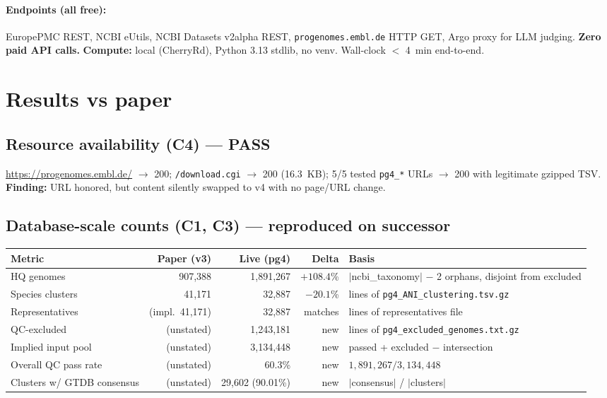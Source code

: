 \documentclass[11pt]{article}
\begin{document}
\paragraph{Endpoints (all free):} EuropePMC REST, NCBI eUtils, NCBI Datasets v2alpha REST, \texttt{progenomes.embl.de} HTTP GET, Argo proxy for LLM judging. \textbf{Zero paid API calls.} \textbf{Compute:} local (CherryRd), Python 3.13 stdlib, no venv. Wall-clock $<$ 4~min end-to-end.

\section{Results vs paper}

\subsection{Resource availability (C4) --- \textcolor{green!50!black}{PASS}}
\url{https://progenomes.embl.de/} $\to$ 200; \texttt{/download.cgi} $\to$ 200 (16.3~KB); 5/5 tested \texttt{pg4\_*} URLs $\to$ 200 with legitimate gzipped TSV. \textbf{Finding:} URL honored, but content silently swapped to v4 with no page/URL change.

\subsection{Database-scale counts (C1, C3) --- \textcolor{green!50!black}{reproduced on successor}}

\begin{center}
\begin{tabular}{lrrrl}
\toprule
Metric & Paper (v3) & Live (pg4) & Delta & Basis \\
\midrule
HQ genomes & 907{,}388 & 1{,}891{,}267 & $+108.4$\% & $|$ncbi\_taxonomy$|$ $-$ 2 orphans, disjoint from excluded \\
Species clusters & 41{,}171 & 32{,}887 & $-20.1$\% & lines of \texttt{pg4\_ANI\_clustering.tsv.gz} \\
Representatives & (impl.\ 41{,}171) & 32{,}887 & matches & lines of representatives file \\
QC-excluded & (unstated) & 1{,}243{,}181 & new & lines of \texttt{pg4\_excluded\_genomes.txt.gz} \\
Implied input pool & (unstated) & 3{,}134{,}448 & new & passed + excluded $-$ intersection \\
Overall QC pass rate & (unstated) & 60.3\% & new & $1{,}891{,}267 / 3{,}134{,}448$ \\
Clusters w/ GTDB consensus & (unstated) & 29{,}602 (90.01\%) & new & $|$consensus$|$ / $|$clusters$|$ \\
\bottomrule
\end{tabular}
\end{center}
\end{document}
